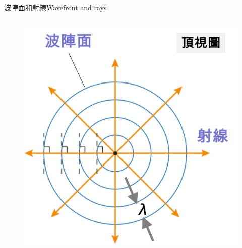 \documentclass[beamer=true]{standalone}
\begin{document}
\begin{frame}{波陣面和射線Wavefront and rays}
\begin{columns}
        \begin{figure}
            \centering
            \includegraphics[width=0.7\linewidth]{images/2.png}

        \end{figure}


    \end{columns}
\end{frame}
\end{document}
